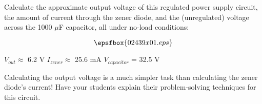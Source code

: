 

Calculate the approximate output voltage of this regulated power supply circuit, the amount of current through the zener diode, and the (unregulated) voltage across the 1000 $\mu$F capacitor, all under no-load conditions:

$$\epsfbox{02439x01.eps}$$







$V_{out} \approx$ 6.2 V \hskip 30pt $I_{zener} \approx$ 25.6 mA \hskip 30pt $V_{capacitor}$ = 32.5 V







Calculating the output voltage is a much simpler task than calculating the zener diode's current!  Have your students explain their problem-solving techniques for this circuit.




